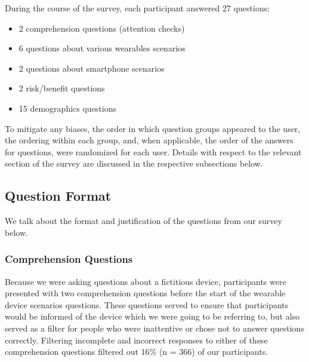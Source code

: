 \documentclass{acm_proc_article-sp}
\begin{document}


During the course of the survey, each participant answered 27 questions:   \\[-.8cm]

\begin{itemize} \itemsep1pt \parskip0pt 
\item 2 comprehension questions (attention checks)
\item 6 questions about various wearables scenarios 
\item 2 questions about smartphone scenarios 
\item 2 risk/benefit questions 
\item 15 demographics questions \\[-.8cm]
\end{itemize}

To mitigate any biases, the order in which question groups appeared to the user, the ordering within each group, and, when applicable, the order of the answers for questions, were randomized for each user. Details with respect to the relevant section of the survey are discussed in the respective subsections below.  

\subsection{Question Format} 
We talk about the format and justification of the questions from our survey below.

\subsubsection{Comprehension Questions}
Because we were asking questions about a fictitious device, participants were presented with two comprehension questions before the start of the wearable device scenarios questions. These questions served to ensure that participants would be informed of the device which we were going to be referring to, but also served as a filter for people who were inattentive or chose not to answer questions correctly. Filtering incomplete and incorrect responses to either of these comprehension questions filtered out 16\% (n = 366) of our participants. 
\end{document}
